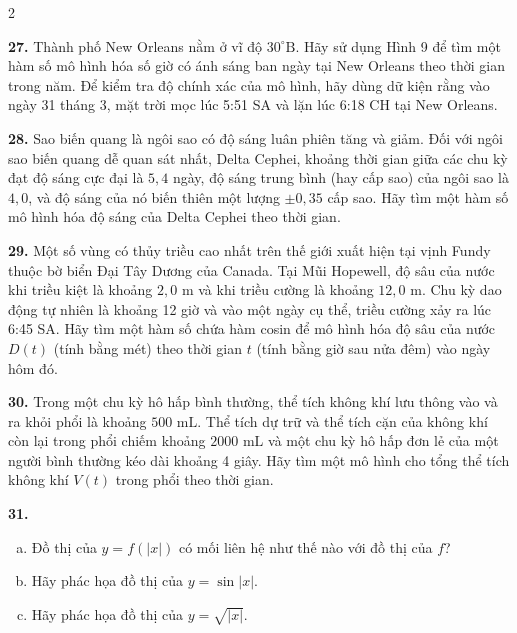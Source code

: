 \begin{multicols}{2}
\vspace{3pt}
\noindent{\color{stewartcyan!60}\rule{\linewidth}{0.6pt}}
\vspace{3pt}

\noindent\textbf{27.} Thành phố New Orleans nằm ở vĩ độ $30^\circ\text{B}$. Hãy sử dụng Hình 9 để tìm một hàm số mô hình hóa số giờ có ánh sáng ban ngày tại New Orleans theo thời gian trong năm. Để kiểm tra độ chính xác của mô hình, hãy dùng dữ kiện rằng vào ngày 31 tháng 3, mặt trời mọc lúc 5:51 SA và lặn lúc 6:18 CH tại New Orleans.

\vspace{3pt}
\noindent\textbf{28.} Sao biến quang là ngôi sao có độ sáng luân phiên tăng và giảm. Đối với ngôi sao biến quang dễ quan sát nhất, Delta Cephei, khoảng thời gian giữa các chu kỳ đạt độ sáng cực đại là $5{,}4$ ngày, độ sáng trung bình (hay cấp sao) của ngôi sao là $4{,}0$, và độ sáng của nó biến thiên một lượng $\pm 0{,}35$ cấp sao. Hãy tìm một hàm số mô hình hóa độ sáng của Delta Cephei theo thời gian.

\vspace{3pt}
\noindent\textbf{29.} Một số vùng có thủy triều cao nhất trên thế giới xuất hiện tại vịnh Fundy thuộc bờ biển Đại Tây Dương của Canada. Tại Mũi Hopewell, độ sâu của nước khi triều kiệt là khoảng $2{,}0\text{ m}$ và khi triều cường là khoảng $12{,}0\text{ m}$. Chu kỳ dao động tự nhiên là khoảng 12 giờ và vào một ngày cụ thể, triều cường xảy ra lúc 6:45 SA. Hãy tìm một hàm số chứa hàm cosin để mô hình hóa độ sâu của nước $D(t)$ (tính bằng mét) theo thời gian $t$ (tính bằng giờ sau nửa đêm) vào ngày hôm đó.

\vspace{3pt}
\noindent\textbf{30.} Trong một chu kỳ hô hấp bình thường, thể tích không khí lưu thông vào và ra khỏi phổi là khoảng $500\text{ mL}$. Thể tích dự trữ và thể tích cặn của không khí còn lại trong phổi chiếm khoảng $2000\text{ mL}$ và một chu kỳ hô hấp đơn lẻ của một người bình thường kéo dài khoảng 4 giây. Hãy tìm một mô hình cho tổng thể tích không khí $V(t)$ trong phổi theo thời gian.

\vspace{3pt}
\noindent\textbf{31.} 
\begin{enumerate}[(a),leftmargin=1.5em,itemsep=1pt,topsep=1pt]
\item Đồ thị của $y = f(|x|)$ có mối liên hệ như thế nào với đồ thị của $f$?
\item Hãy phác họa đồ thị của $y = \sin|x|$.
\item Hãy phác họa đồ thị của $y = \sqrt{|x|}$.
\end{enumerate}


\end{multicols}
